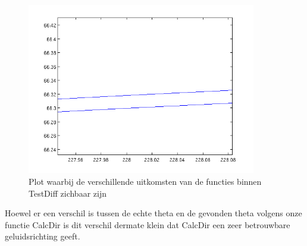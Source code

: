 \documentclass{article}
\begin{document}
\begin{figure}[h]
	\center
	\includegraphics[width = 10cm]{5b.png}
	\caption{Plot waarbij de verschillende uitkomsten van de functies binnen TestDiff zichbaar zijn}
 \label{5b}	
\end{figure}

Hoewel er een verschil is tussen de echte theta en de gevonden theta volgens onze functie CalcDir is dit verschil dermate klein dat CalcDir een zeer betrouwbare geluidsrichting geeft.
\end{document}
